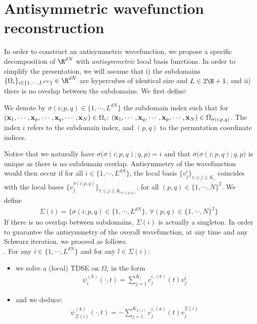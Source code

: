 \appendix
\section{Antisymmetric wavefunction reconstruction}\label{APXA}
\noindent In order to construct an antisymmetric wavefunction, we propose a specific decomposition of $\R^{dN}$ with {\it antisymmetric} local basis functions. In order to simplify the presentation, we will assume that i) the subdomains $\{\Omega_i\}_{i \in \{1,\cdots,L^{dN}\}}\in \R^{dN}$ are hypercubes of identical size and $L\in 2\N+1$, and ii) there is no overlap between the subdomains. We first define:
\begin{definition}
 We denote by $\sigma(i;p,q) \in \{1,\cdots,L^{dN}\}$ the subdomain index such that for $({\bf x}_1,\cdots,{\bf x}_p,\cdots,{\bf x}_q,\cdots,{\bf x}_N) \in \Omega_{i}$: $({\bf x}_1,\cdots,{\bf x}_q,\cdots,{\bf x}_p,\cdots,{\bf x}_N) \in \Omega_{\sigma(i;p,q)}$. The index $i$ refers to the subdomain index, and $(p,q)$ to the permutation coordinate indices.
\end{definition}
Notice that we naturally have $\sigma\big(\sigma(i;p,q);q,p\big)=i$ and that $\sigma\big(\sigma(i;p,q);q,p\big)$ is unique as there is no subdomain overlap. %
Antisymmetry of the wavefunction would then occur if for all $i \in\{1,\cdots,L^{dN}\}$, the local basis $\big\{v^{i}_j\big\}_{1\leq j\leq K_i}$ coincides with the local bases $\big\{v^{\sigma(i;p,q)}_j\big\}_{1\leq j \leq K_{\sigma(i;p,q)}}$, for all $(p,q) \in\{1,\cdots,N\}^2$.  We define
\begin{eqnarray*}
\Sigma(i)=\big\{\sigma(i;p,q)\in \{1,\cdots,L^{dN}\}, \, \forall (p,q)\in \{1,\cdots,N\}^2\big\}
\end{eqnarray*}
If there is no overlap between subdomains, $\Sigma(i)$ is actually a singleton. In order to guarantee the antisymmetry of the overall wavefunction, at any time and any Schwarz iteration, we proceed as follows. \\
. For any $i\in \{1,\cdots,L^{dN}\}$ and for any $l \in \Sigma(i)$:
\begin{itemize}
\item we solve a (local) TDSE on $\Omega_i$ in the form
\begin{eqnarray}\label{statWF}
\psi^{(k)}_i(\cdot,t) = \sum_{j=1}^{K_i}c_j^{i,(k)}(t)v^i_{j}
\end{eqnarray}
\item and we deduce:
\begin{eqnarray}\label{statWF2}
\psi^{(k)}_{\Sigma(i)}(\cdot,t) = -\sum_{j=1}^{K_{\Sigma(i)}}c_j^{i,(k)}(t)v^{\Sigma(i)}_{j}
\end{eqnarray}
\end{itemize}
